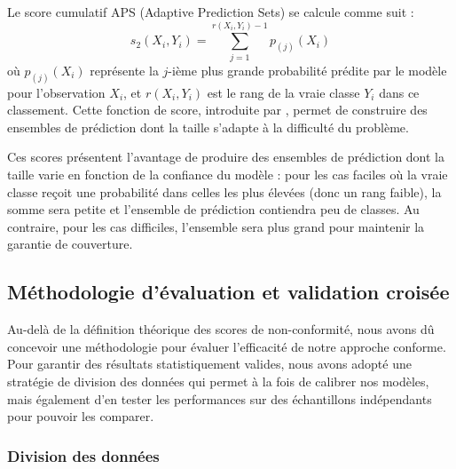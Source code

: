 \documentclass[a4paper,12pt]{article}
\begin{document}
\vspace{0.2cm}

Le score cumulatif APS (Adaptive Prediction Sets) se calcule comme suit : 
$$ s_2(X_i, Y_i) = \sum_{j=1}^{r(X_i, Y_i)-1} p_{(j)}(X_i) $$ où $p_{(j)}(X_i)$ représente la $j$-ième plus grande probabilité prédite par le modèle pour l'observation $X_i$, et $r(X_i, Y_i)$ est le rang de la vraie classe $Y_i$ dans ce classement. Cette fonction de score, introduite par \cite{Romano}, permet de construire des ensembles de prédiction dont la taille s'adapte à la difficulté du problème.

\vspace{0.2cm}

Ces scores présentent l'avantage de produire des ensembles de prédiction dont la taille varie en fonction de la confiance du modèle : pour les cas faciles où la vraie classe reçoit une probabilité dans celles les plus élevées (donc un rang faible), la somme sera petite et l'ensemble de prédiction contiendra peu de classes. Au contraire, pour les cas difficiles, l'ensemble sera plus grand pour maintenir la garantie de couverture.


\subsection{Méthodologie d'évaluation et validation croisée}

Au-delà de la définition théorique des scores de non-conformité, nous avons dû concevoir une méthodologie pour évaluer l'efficacité de notre approche conforme. Pour garantir des résultats statistiquement valides, nous avons adopté une stratégie de division des données qui permet à la fois de calibrer nos modèles, mais également d'en tester les performances sur des échantillons indépendants pour pouvoir les comparer.

\subsubsection{Division des données}
\end{document}
